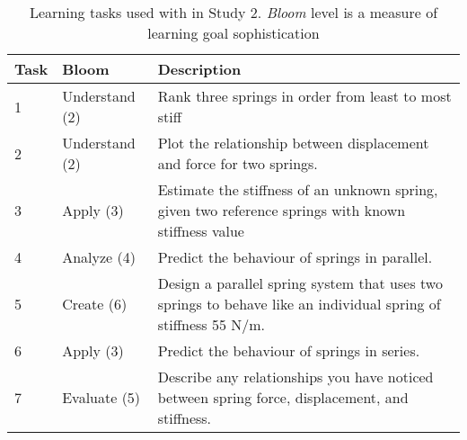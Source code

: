 \begin{table}[tb] \footnotesize
    \begin{tabular}{|p{0.40in}|p{1.00in}|p{3.3in}|}
    \hline
    \textbf{Task} & \textbf{Bloom} &  \textbf{Description} \\ \hline
    1    & Understand (2) &  Rank three springs in order from least to most stiff  \\ \hline
    2    & Understand (2) & Plot the relationship between displacement and force for two springs. \\    \hline
    3    & Apply (3) & Estimate the stiffness of an unknown spring, given two reference springs with known stiffness value \\ \hline
    4    & Analyze (4) & Predict the behaviour of springs in parallel. \\ \hline
    5    & Create (6) & Design a parallel spring system that uses two springs to behave like an individual spring of stiffness 55 N/m. \\ \hline
    6    & Apply (3)  & Predict the behaviour of springs in series. \\ \hline
    7    & Evaluate (5) & Describe any relationships you have noticed between spring force, displacement, and stiffness. \\ \hline
    \end{tabular}
    
    
    \caption{Learning tasks used with \SpringSim in Study 2. \textit{Bloom} level is a measure of learning goal sophistication \cite{bloom1969taxonomy} %
   }
   
    \label{tab:SpringTasks}
\end{table}

%
